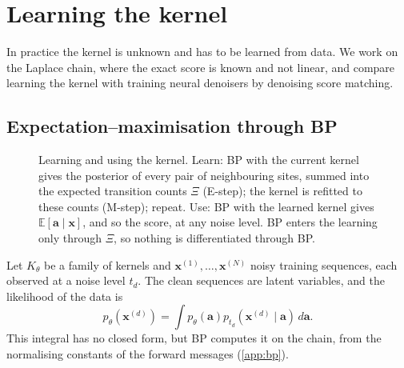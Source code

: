 \section{Learning the kernel}
\label{sec:laplace}

In practice the kernel is unknown and has to be learned from data. We work on the Laplace chain, where the exact score
is known and not linear, and compare learning the kernel with training neural denoisers by denoising score matching.

\subsection{Expectation--maximisation through BP}
\label{sec:em}

\begin{figure}[t]
  \centering
  
  \caption{Learning and using the kernel. Learn: BP with the current kernel gives the posterior of every pair of
  neighbouring sites, summed into the expected transition counts $\Xi$ (E-step); the kernel is refitted to these
  counts (M-step); repeat. Use: BP with the learned kernel gives $\mathbb E[\mathbf a\mid\mathbf x]$, and so the score,
  at any noise level. BP enters the learning only through $\Xi$, so nothing is differentiated through BP.}
  \label{fig:em-loop}
\end{figure}

Let $K_\theta$ be a family of kernels and $\mathbf{x}^{(1)},\ldots,\mathbf{x}^{(N)}$ noisy training sequences, each
observed at a noise level $t_d$. The clean sequences are latent variables, and the likelihood of the data is
\begin{equation}
    p_\theta(\mathbf{x}^{(d)})
    =
    \int
    p_\theta(\mathbf{a})
    p_{t_d}(\mathbf{x}^{(d)}\mid\mathbf{a})
    \,d\mathbf{a}.
\end{equation}
This integral has no closed form, but BP computes it on the chain, from the normalising constants of the forward
messages (\cref{app:bp}).

